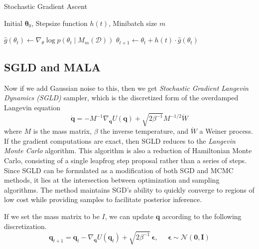 \documentclass{article}
\begin{document}
    \begin{algorithm}
      \caption{Stochastic Gradient Ascent}\label{alg:sgd}
      \begin{algorithmic}

      \Require Initial $\boldsymbol{\theta}_0$, Stepsize function $h(t)$, Minibatch size $m$

          \State $\hat{g}(\theta_t) \gets \nabla_\theta \log{p(\theta_t \mid M_m(\mathcal{D}))}$
          \State $\theta_{t+1} \gets \theta_t + h(t) \cdot \hat{g}(\theta_t)$
      \EndFor

      \end{algorithmic}
    \end{algorithm}

  \subsection{SGLD and MALA}

    Now if we add Gaussian noise to this, then we get \textit{Stochastic Gradient Langevin Dynamics (SGLD)} sampler, which is the discretized form of the overdamped Langevin equation 
    \begin{equation}
      \mathbf{\dot{q}} = - M^{-1} \nabla_\mathbf{q} U(\mathbf{q}) + \sqrt{2 \beta^{-1}} M^{-1/2} \dot{W}
    \end{equation}
    where $M$ is the mass matrix, $\beta$ the inverse temperature, and $\dot{W}$ a Weiner process. If the gradient computations are exact, then SGLD reduces to the \textit{Langevin Monte Carlo} algorithm. This algorithm is also a reduction of Hamiltonian Monte Carlo, consisting of a single leapfrog step proposal rather than a series of steps. Since SGLD can be formulated as a modification of both SGD and MCMC methods, it lies at the intersection between optimization and sampling algorithms. The method maintains SGD's ability to quickly converge to regions of low cost while providing samples to facilitate posterior inference. 

    If we set the mass matrix to be $I$, we can update $\mathbf{q}$ according to the following discretization. 
    \begin{equation}
      \mathbf{q}_{t+1} = \mathbf{q}_t - \nabla_{\mathbf{q}} U(\mathbf{q}_t) + \sqrt{2 \beta^{-1}} \, \boldsymbol{\epsilon}, \;\;\;\;\; \boldsymbol{\epsilon} \sim \mathcal{N}(\mathbf{0}, \mathbf{I})
    \end{equation}
\end{document}
